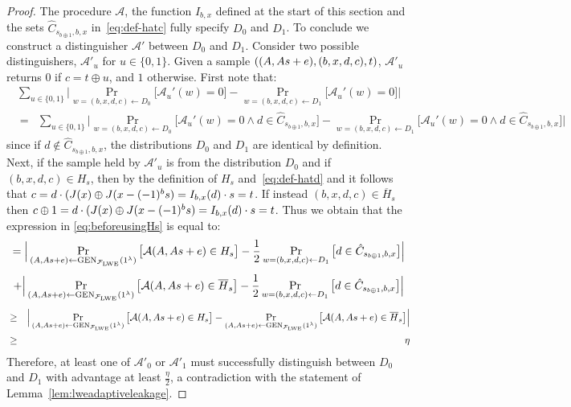 \begin{proof}
The procedure $\mathcal{A}$, the function $I_{b,x}$ defined at the start of this section and the sets $\hat{C}_{s_{b\oplus 1},b,x}$ in~\eqref{eq:def-hatc} fully specify ${D}_0$ and ${D}_1$. To conclude we construct a distinguisher $\mathcal{A}'$ between ${D}_0$ and ${D}_1$. Consider two possible distinguishers, $\mathcal{A}'_u$ for $u\in \{0,1\}$. Given a sample $((\*A,\*A\*s+\*e),(b,x,d,c),t)$, $\mathcal{A}'_u$ returns $0$ if $c=t\oplus u$, and $1$ otherwise. First note that:
\begin{eqnarray}
\sum_{u\in \{0,1\}} \Big|\Pr_{w=(b,x,d,c)\leftarrow {D}_0}\big[\mathcal{A}_u'(w)=0\big]-\Pr_{w=(b,x,d,c)\leftarrow {D}_1}\big[\mathcal{A}_u'(w)=0\big]\Big|
\end{eqnarray}
\begin{eqnarray}
&=& \sum_{u\in\{0,1\}}\Big|\Pr_{w=(b,x,d,c)\leftarrow {D}_0}\big[\mathcal{A}_u'(w)=0 \wedge d\in \hat{C}_{s_{b\oplus 1},b,x} \big]-\Pr_{w=(b,x,d,c)\leftarrow {D}_1}\big[\mathcal{A}_u'(w)=0 \wedge d\in \hat{C}_{s_{b\oplus 1},b,x}\big]\Big|\label{eq:beforeusingHs}
\end{eqnarray}
since if $d\notin \hat{C}_{s_{b\oplus 1},b,x}$, the distributions ${D}_0$ and ${D}_1$ are identical by definition. Next, if the sample held by $\mathcal{A}'_u$ is from the distribution ${D}_0$ and if $(b,x,d,c) \in H_s$, then by the definition of $H_s$ and~\eqref{eq:def-hatd} and it follows that $c = d\cdot(\inj(x)\oplus \inj( x - (-1)^b \*s )  = I_{b,x}(d)\cdot s = t$. If instead $(b,x,d,c)\in \overline{H}_s$ then $c\oplus 1 = d\cdot(\inj(x)\oplus \inj( x - (-1)^b \*s ) = I_{b,x}(d)\cdot s = t$.
Thus we obtain that the expression in \eqref{eq:beforeusingHs} is equal to: 
\begin{equation}
= \Big|\Pr_{(\*A,\*A\*s+\*e)\leftarrow \textrm{GEN}_{\mathcal{F}_{\lwe}}(1^{\lambda})}\big[\mathcal{A}(\*A,\*A\*s+\*e) \in H_s\big] -\frac{1}{2}\Pr_{w=(b,x,d,c)\leftarrow {D}_1}\big[ d\in \hat{C}_{s_{b\oplus 1},b,x}\big]\Big| 
\end{equation}
\begin{equation}
+ \Big|\Pr_{(\*A,\*A\*s+\*e)\leftarrow \textrm{GEN}_{\mathcal{F}_{\lwe}}(1^{\lambda})}\big[\mathcal{A}(\*A,\*A\*s+\*e) \in \overline{H}_s\big]-\frac{1}{2}\Pr_{w=(b,x,d,c)\leftarrow {D}_1}\big[ d\in \hat{C}_{s_{b\oplus 1},b,x}\big]\Big|\\
\end{equation}
\begin{eqnarray}
&\geq& \Big|\Pr_{(\*A,\*A\*s+\*e)\leftarrow \textrm{GEN}_{\mathcal{F}_{\lwe}}(1^{\lambda})}\big[\mathcal{A}(\*A,\*A\*s+\*e) \in H_s\big] - \Pr_{(\*A,\*A\*s+\*e)\leftarrow \textrm{GEN}_{\mathcal{F}_{\lwe}}(1^{\lambda})}\big[\mathcal{A}(\*A,\*A\*s+\*e) \in \overline{H}_s\big]\Big| \\
&\geq& \eta
\end{eqnarray} 
Therefore, at least one of $\mathcal{A}'_0$ or $\mathcal{A}'_1$ must successfully distinguish between ${D}_0$ and ${D}_1$ with advantage at least $\frac{\eta}{2}$, a contradiction with the statement of Lemma~\ref{lem:lweadaptiveleakage}. 
\end{proof}